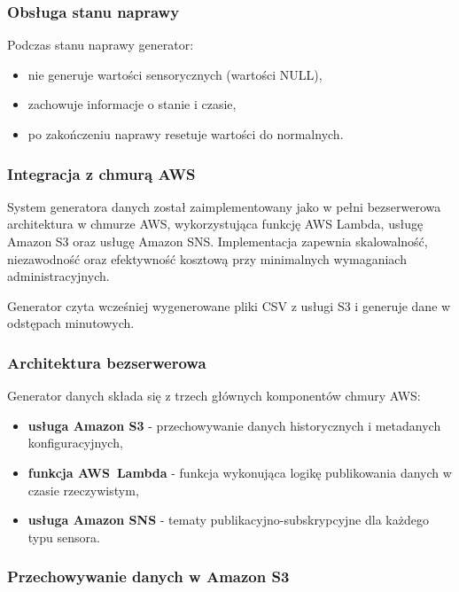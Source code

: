 \subsubsection{Obsługa stanu naprawy}

Podczas stanu naprawy generator:
\begin{itemize}
    \item nie generuje wartości sensorycznych (wartości NULL),
    \item zachowuje informacje o stanie i czasie,
    \item po zakończeniu naprawy resetuje wartości do normalnych.
\end{itemize}

\subsubsection{Integracja z chmurą AWS}
\label{sec:integracja_aws}

System generatora danych został zaimplementowany jako w pełni bezserwerowa architektura w chmurze AWS, wykorzystująca funkcję AWS Lambda, usługę Amazon S3 oraz usługę Amazon SNS. Implementacja zapewnia skalowalność, niezawodność oraz efektywność kosztową przy minimalnych wymaganiach administracyjnych.

Generator czyta wcześniej wygenerowane pliki CSV z usługi S3 i generuje dane w odstępach minutowych.

\subsubsection{Architektura bezserwerowa}
\label{subsec:architektura_bezserwerowa}

Generator danych składa się z trzech głównych komponentów chmury AWS:

\begin{itemize}
    \item \textbf{usługa Amazon S3} - przechowywanie danych historycznych i metadanych konfiguracyjnych,
    \item \textbf{funkcja \mbox{AWS Lambda}} - funkcja wykonująca logikę publikowania danych w czasie rzeczywistym,
    \item \textbf{usługa Amazon SNS} - tematy publikacyjno-subskrypcyjne dla każdego typu sensora.
\end{itemize}

\subsubsection{Przechowywanie danych w Amazon S3}
\label{subsec:amazon_s3}

